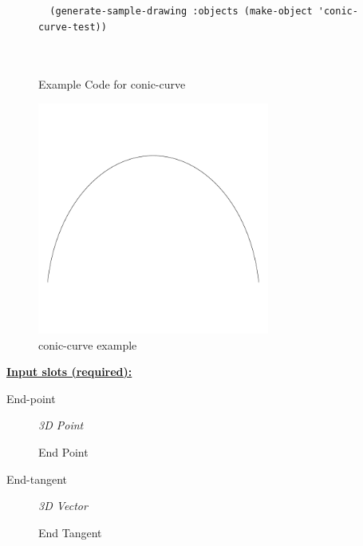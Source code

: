 \documentclass [11pt]{book}
\begin{document}
\begin{itemize}
\begin{figure}
\begin{lrbox}{\boxedverb}
\begin{minipage}{\linewidth}
{\begin{verbatim}
  (generate-sample-drawing :objects (make-object 'conic-curve-test))



\end{verbatim}}
\end{minipage}
\end{lrbox}
\fbox{\usebox{\boxedverb}}

\caption{Example Code for conic-curve}

\label{fig:example-code-conic-curve}

\end{figure}

\begin{figure}
\begin{center}
\includegraphics[width=3in,height=3in]{../images/example-conic-curve.pdf}
\end{center}

\caption{conic-curve example}

\label{fig:conic-curve}

\end{figure}





\textbf{
\underline{Input slots (required):}}

\begin{description}

\item [End-point]
\emph{3D Point}

 End Point




\item [End-tangent]
\emph{3D Vector}

 End Tangent





\end{description}
\end{itemize}
\end{document}
